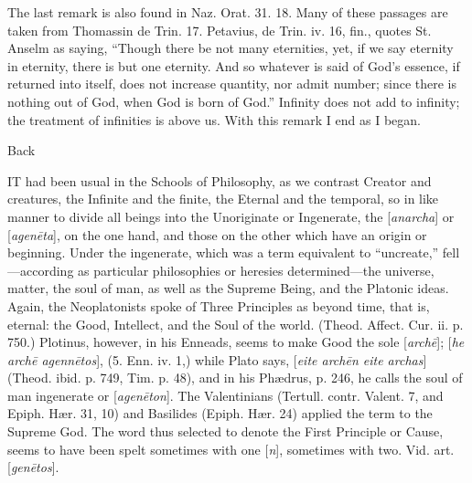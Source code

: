 The last remark is also found in Naz. Orat. 31.
18. Many of these passages are taken from Thomassin de Trin. 17.
Petavius, de Trin. iv. 16, fin., quotes St. Anselm as saying, ``Though
there be not many eternities, yet, if we say eternity in eternity,
there is but one eternity. And so whatever is said of God's essence,
if returned into itself, does not increase quantity, nor admit number;
since there is nothing out of God, when God is born of God.'' Infinity
does not add to infinity; the treatment of infinities is above us.
With this remark I end as I began.


Back


IT had been usual in the Schools of Philosophy, as we contrast
Creator and creatures, the Infinite and the finite, the Eternal and
the temporal, so in like manner to divide all beings into the
Unoriginate or Ingenerate, the [\emph{anarcha}] or [\emph{agen\={e}ta}],
on the one hand, and those on the other which have an origin or
beginning. Under the ingenerate, which was a term equivalent to ``uncreate,''
fell—according as particular philosophies or heresies
determined—the universe, matter, the soul of man, as well as the
Supreme Being, and the Platonic ideas. Again, the Neoplatonists spoke
of Three Principles as beyond time, that is, eternal: the Good,
Intellect, and the Soul of the world. (Theod. Affect. Cur. ii. p.
750.) Plotinus, however, in his Enneads, seems to make Good the sole [\emph{arch\={e}}];
[\emph{he arch\={e} agenn\={e}tos}], (5. Enn. iv. 1,) while
Plato says, [\emph{eite arch\={e}n eite archas}] (Theod. ibid. p.
749, Tim. p. 48), and in his Phædrus, p. 246, he calls the soul of
man ingenerate or [\emph{agen\={e}ton}]. The Valentinians (Tertull.
contr. Valent. 7, and Epiph. Hær. 31, 10) and Basilides (Epiph. Hær.
24) applied the term to the Supreme God. The word thus selected
to denote the First Principle or Cause, seems to have been spelt
sometimes with one [\emph{n}], sometimes with two. Vid. art. [\emph{gen\={e}tos}].

